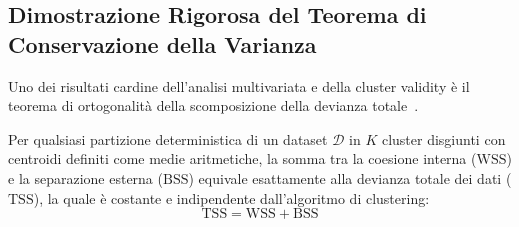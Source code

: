 \FloatBarrier
\subsection{Dimostrazione Rigorosa del Teorema di Conservazione della Varianza}
Uno dei risultati cardine dell'analisi multivariata e della cluster validity è il teorema di ortogonalità della scomposizione della devianza totale~\cite{tan2018}.

\begin{theorem}
\label{thm:dm-tss-wss-bss}
Per qualsiasi partizione deterministica di un dataset $\mathcal{D}$ in $K$ cluster disgiunti con centroidi definiti come medie aritmetiche, la somma tra la coesione interna ($\mathrm{WSS}$) e la separazione esterna ($\mathrm{BSS}$) equivale esattamente alla devianza totale dei dati ($\mathrm{TSS}$), la quale è costante e indipendente dall'algoritmo di clustering:
\begin{equation}
\label{eq:dm-tss-conservation}
\mathrm{TSS} = \mathrm{WSS} + \mathrm{BSS}
\end{equation}
\end{theorem}

